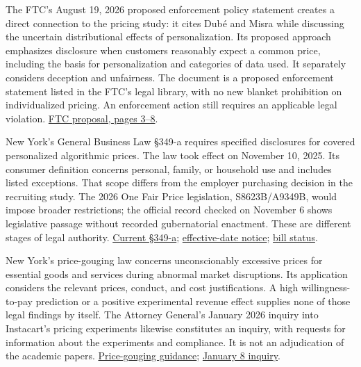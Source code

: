 The FTC's August 19, 2026 proposed enforcement policy statement creates
a direct connection to the pricing study: it cites Dubé and Misra while
discussing the uncertain distributional effects of personalization. Its
proposed approach emphasizes disclosure when customers reasonably expect
a common price, including the basis for personalization and categories
of data used. It separately considers deception and unfairness. The
document is a proposed enforcement statement listed in the FTC's legal
library, with no new blanket prohibition on individualized pricing. An
enforcement action still requires an applicable legal violation.
\href{https://www.ftc.gov/system/files/ftc_gov/pdf/p034101-ftc-enforcement-policy-statement-re-personalized-pricing-proposed-for-public-comment.pdf}{FTC
proposal, pages 3--8}.

New York's General Business Law §349-a requires specified disclosures
for covered personalized algorithmic prices. The law took effect on
November 10, 2025. Its consumer definition concerns personal, family, or
household use and includes listed exceptions. That scope differs from
the employer purchasing decision in the recruiting study. The 2026 One
Fair Price legislation, S8623B/A9349B, would impose broader
restrictions; the official record checked on November 6 shows
legislative passage without recorded gubernatorial enactment. These are
different stages of legal authority.
\href{https://www.nysenate.gov/legislation/laws/GBS/349-A}{Current
§349-a};
\href{https://ag.ny.gov/press-release/2025/attorney-general-james-warns-new-yorkers-about-algorithmic-pricing-new-law-takes}{effective-date
notice};
\href{https://www.nysenate.gov/legislation/bills/2025/S8623}{bill
status}.

New York's price-gouging law concerns unconscionably excessive prices
for essential goods and services during abnormal market disruptions. Its
application considers the relevant prices, conduct, and cost
justifications. A high willingness-to-pay prediction or a positive
experimental revenue effect supplies none of those legal findings by
itself. The Attorney General's January 2026 inquiry into Instacart's
pricing experiments likewise constitutes an inquiry, with requests for
information about the experiments and compliance. It is not an
adjudication of the academic papers.
\href{https://ag.ny.gov/resources/individuals/consumer-issues/price-gouging}{Price-gouging
guidance};
\href{https://ag.ny.gov/press-release/2026/attorney-general-james-demands-answers-instacart-about-algorithmic-pricing}{January
8 inquiry}.

